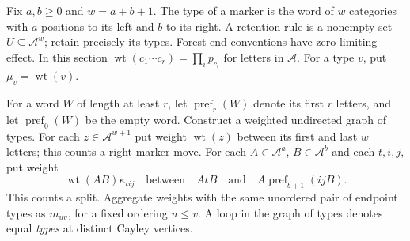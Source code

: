 \documentclass[11pt,a4paper]{article}
\theoremstyle{definition}
\theoremstyle{remark}
\newcommand{\wt}{\operatorname{wt}}
\DeclareMathOperator{\pref}{pref}
\begin{document}
Fix $a,b\ge0$ and $w=a+b+1$. The type of a marker is the word of $w$ categories with $a$ positions to its left and $b$ to its right. A retention rule is a nonempty set $U\subseteq\mathcal A^w$; retain precisely its types. Forest-end conventions have zero limiting effect. In this section $\wt(c_1\cdots c_r)=\prod_i p_{c_i}$ for letters in $\mathcal A$. For a type $v$, put $\mu_v=\wt(v)$.

For a word $W$ of length at least $r$, let $\pref_r(W)$ denote its first $r$ letters, and let $\pref_0(W)$ be the empty word. Construct a weighted undirected graph of types. For each $z\in\mathcal A^{w+1}$ put weight $\wt(z)$ between its first and last $w$ letters; this counts a right marker move. For each $A\in\mathcal A^a$, $B\in\mathcal A^b$ and each $t,i,j$, put weight
\begin{equation}\label{eq:windowedge}
\wt(AB)\kappa_{tij}
\quad\text{between}\quad AtB\quad\text{and}\quad A\pref_{b+1}(ijB).
\end{equation}
This counts a split. Aggregate weights with the same unordered pair of endpoint types as $m_{uv}$, for a fixed ordering $u\le v$. A loop in the graph of types denotes equal \emph{types} at distinct Cayley vertices.
\end{document}
